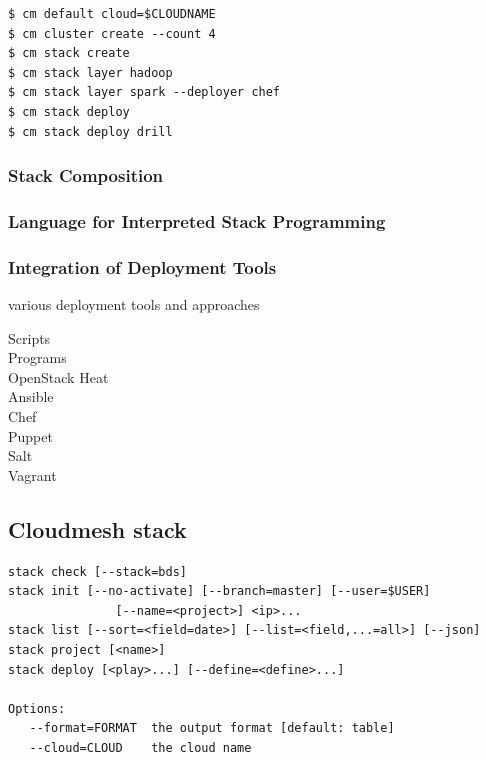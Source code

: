 \begin{Verbatim}[fontfamily=helvetica]
$ cm default cloud=$CLOUDNAME
$ cm cluster create --count 4
$ cm stack create
$ cm stack layer hadoop
$ cm stack layer spark --deployer chef
$ cm stack deploy
$ cm stack deploy drill
\end{Verbatim}


\subsubsection{Stack Composition} \label{S:composition}


\subsubsection{Language for Interpreted Stack Programming} \label{S:stack-lisp}


\subsubsection{Integration of Deployment Tools}

various deployment tools and approaches

\begin{description}
\item[Scripts]
\item[Programs]
\item[OpenStack Heat]
\item[Ansible]
\item[Chef]
\item[Puppet]
\item[Salt]
\item[Vagrant]
\end{description}

\subsection{Cloudmesh stack}

\begin{Verbatim}[fontfamily=helvetica]
stack check [--stack=bds]
stack init [--no-activate] [--branch=master] [--user=$USER] 
               [--name=<project>] <ip>...
stack list [--sort=<field=date>] [--list=<field,...=all>] [--json]
stack project [<name>]
stack deploy [<play>...] [--define=<define>...]

Options:
   --format=FORMAT  the output format [default: table]
   --cloud=CLOUD    the cloud name
\end{Verbatim}

